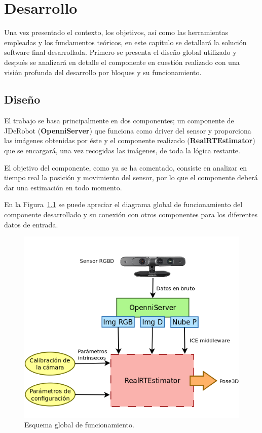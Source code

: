
\chapter{Desarrollo}

\label{Chapter4} %

Una vez presentado el contexto, los objetivos, así como las herramientas empleadas y los fundamentos teóricos, en este capítulo se detallará la solución software final desarrollada. Primero se presenta el diseño global utilizado y después se analizará en detalle el componente en cuestión realizado con una visión profunda del desarrollo por bloques y su funcionamiento.


\section{Diseño}

El trabajo se basa principalmente en dos componentes; un componente de JDeRobot (\textbf{OpenniServer}) que funciona como driver del sensor y proporciona las imágenes obtenidas por éste y el componente realizado (\textbf{RealRTEstimator}) que se encargará, una vez recogidas las imágenes, de toda la lógica restante.

El objetivo del componente, como ya se ha comentado, consiste en analizar en tiempo real la posición y movimiento del sensor, por lo que el componente deberá dar una estimación en todo momento.

En la Figura~\ref{fig:diagram1} se puede apreciar el diagrama global de funcionamiento del componente desarrollado y su conexión con otros componentes para los diferentes datos de entrada.

\begin{figure}[th]
\centering
\includegraphics[scale=0.4]{Figures/diagram1.png}
\decoRule
\caption[Esquema general del componente RealRTEstimator]{Esquema global de funcionamiento.}
\label{fig:diagram1}
\end{figure}

